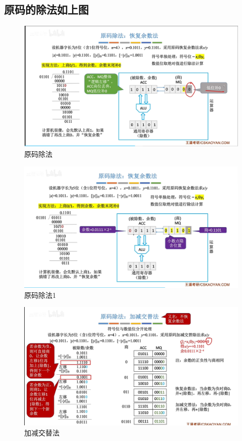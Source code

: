 \documentclass[12pt]{ctexart}
\begin{document}
\subsection{原码的除法如上图}
\begin{figure}[htbp]
    \centering
    \includegraphics[scale=0.6]{原码除法.png}
    \caption{原码除法}
    \end{figure} 

\begin{figure}[htbp]
        \centering
        \includegraphics[scale=0.6]{原码除法1.png}
        \caption{原码除法1}
        \end{figure} 
\begin{figure}[htbp]
        \centering
        \includegraphics[scale=0.6]{加减交替法.png}
        \caption{加减交替法}
        \end{figure} 
\end{document}
